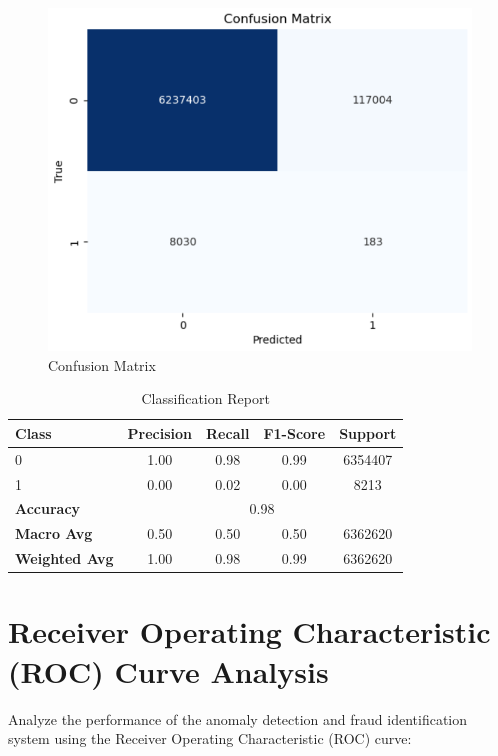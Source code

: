 \begin{figure}[H]
	\centering
	\includegraphics[width=0.7\linewidth]{chap4/6}
	\caption{Confusion Matrix}
	\label{fig:6}
\end{figure}


\begin{table}[htbp]
	\centering
	\caption{Classification Report}
	\label{tab:classification_report}
	\begin{tabular}{lcccc}
		\toprule
		\textbf{Class} & \textbf{Precision} & \textbf{Recall} & \textbf{F1-Score} & \textbf{Support} \\
		\midrule
		0 & 1.00 & 0.98 & 0.99 & 6354407 \\
		1 & 0.00 & 0.02 & 0.00 & 8213 \\
		\midrule
		\textbf{Accuracy} & \multicolumn{4}{c}{0.98} \\
		\textbf{Macro Avg} & 0.50 & 0.50 & 0.50 & 6362620 \\
		\textbf{Weighted Avg} & 1.00 & 0.98 & 0.99 & 6362620 \\
		\bottomrule
	\end{tabular}
\end{table}

\section{Receiver Operating Characteristic (ROC) Curve Analysis}
\hspace{\parindent}
Analyze the performance of the anomaly detection and fraud identification system using the Receiver Operating Characteristic (ROC) curve:

